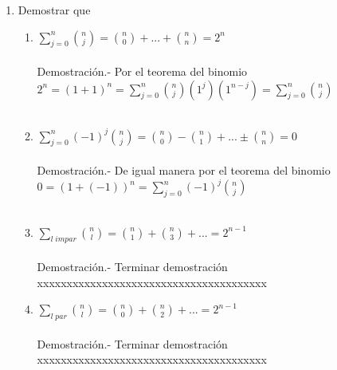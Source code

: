 \begin{teo}
\begin{enumerate}[\bfseries a)]
\item Demostrar que 
\begin{enumerate}[\bfseries i)]
\item $\displaystyle\sum_{j=0}^{n} {n \choose j} = {n \choose 0} + ... + {n \choose n} = 2^n$\\\\
Demostración.- \; Por el teorema del binomio $2^n=(1+1)^n = \displaystyle\sum_{j=0}^n {n \choose j}(1^j)(1^{n-j})=\sum_{j=0}^n {n \choose j}$\\\\

\item $\displaystyle\sum_{j=0}^n (-1)^j {n \choose j} = {n \choose 0}- {n \choose 1}+...\pm {n \choose n} =0$\\\\
Demostración.- \;  De igual manera por el teorema del binomio $0=(1+(-1))^n = \displaystyle\sum_{j=0}^n(-1)^j {n \choose j}$\\\\ 

\item $\displaystyle\sum_{l \; impar} {n \choose l} = {n \choose 1} + {n \choose 3}+ ... = 2^{n-1}$\\\\
Demostración.- \;  {\color{green}Terminar demostración xxxxxxxxxxxxxxxxxxxxxxxxxxxxxxxxxxxxxxx}

\item $\displaystyle\sum_{l \; par} {n \choose l} = {n \choose 0} + {n \choose 2} + ...  = 2^{n-1}$\\\\
Demostración.- \; {\color{green}Terminar demostración xxxxxxxxxxxxxxxxxxxxxxxxxxxxxxxxxxxxxxx}
\end{enumerate}
\end{enumerate}
\end{teo}


